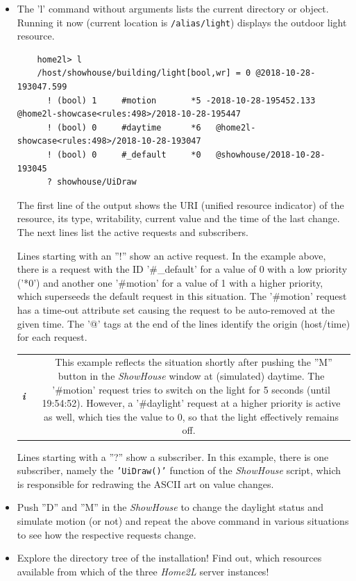 \documentclass[12pt,english,parskip=half]{scrreprt}
\newcommand{\infobox}[1]{
  \hfill
  \setlength\arrayrulewidth{1pt}
  \begin{tabular}[t]{c|c|}
    \parbox{1.8em}{\hfill\textit{\Huge\textbf{i}\,}}
    &
    \,\parbox{0.89\linewidth}{\setlength{\parskip}{0.5em}#1}\,
  \end{tabular}
  \par
}
\begin{document}
\begin{itemize}[$\blacktriangleright$]
\item
  The 'l' command without arguments lists the current directory or
  object. Running it now (current location is \texttt{/alias/light})
  displays the outdoor light resource.
  \begin{lstlisting}
    home2l> l
    /host/showhouse/building/light[bool,wr] = 0 @2018-10-28-193047.599
      ! (bool) 1     #motion       *5 -2018-10-28-195452.133   @home2l-showcase<rules:498>/2018-10-28-195447
      ! (bool) 0     #daytime      *6   @home2l-showcase<rules:498>/2018-10-28-193047
      ! (bool) 0     #_default     *0   @showhouse/2018-10-28-193045
      ? showhouse/UiDraw
  \end{lstlisting}

  The first line of the output shows the URI (unified resource indicator)
  of the resource, its type, writability, current value and the time of
  the last change. The next lines list the active requests and
  subscribers.

  Lines starting with an ''!'' show an active request. In the example
  above, there is a request with the ID '\#\_default' for a value of 0
  with a low priority ('*0') and another one '\#motion' for a value of 1
  with a higher priority, which superseeds the default request in this
  situation. The '\#motion' request has a time-out attribute set causing
  the request to be auto-removed at the given time. The '@' tags at the
  end of the lines identify the origin (host/time) for each request.

  \infobox{
    This example reflects the situation shortly after pushing the ''M''
    button in the \textit{ShowHouse} window  at (simulated) daytime.
    The '\#motion' request tries to switch on the light for 5 seconds
    (until 19:54:52). However, a '\#daylight' request at a higher
    priority is active as well, which ties the value to 0, so that the
    light effectively remains off.
  }

  Lines starting with a ''?'' show a subscriber. In this example, there is
  one subscriber, namely the \texttt{'UiDraw()'} function of the \emph{ShowHouse}
  script, which is responsible for redrawing the ASCII art on value
  changes.

\item
  Push ''D'' and ''M'' in the \emph{ShowHouse} to change the daylight
  status and simulate motion (or not) and repeat the above command in
  various situations to see how the respective requests change.

\item
  Explore the directory tree of the installation! Find out, which resources
  available from which of the three \emph{Home2L} server instances!

\end{itemize}
\end{document}
